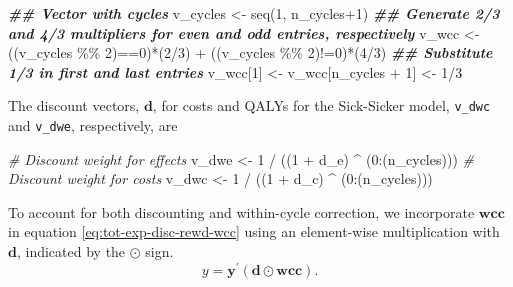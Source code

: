 \documentclass[
]{article}
\newenvironment{Shaded}{\begin{snugshade}}{\end{snugshade}}
\newcommand{\CommentTok}[1]{\textcolor[rgb]{0.56,0.35,0.01}{\textit{#1}}}
\newcommand{\DecValTok}[1]{\textcolor[rgb]{0.00,0.00,0.81}{#1}}
\newcommand{\DocumentationTok}[1]{\textcolor[rgb]{0.56,0.35,0.01}{\textbf{\textit{#1}}}}
\newcommand{\FunctionTok}[1]{\textcolor[rgb]{0.00,0.00,0.00}{#1}}
\newcommand{\NormalTok}[1]{#1}
\newcommand{\OtherTok}[1]{\textcolor[rgb]{0.56,0.35,0.01}{#1}}
\newcommand{\SpecialCharTok}[1]{\textcolor[rgb]{0.00,0.00,0.00}{#1}}
\begin{document}
\begin{Shaded}
\begin{Highlighting}[]
\DocumentationTok{\#\# Vector with cycles}
\NormalTok{v\_cycles }\OtherTok{\textless{}{-}} \FunctionTok{seq}\NormalTok{(}\DecValTok{1}\NormalTok{, n\_cycles}\SpecialCharTok{+}\DecValTok{1}\NormalTok{)}
\DocumentationTok{\#\# Generate 2/3 and 4/3 multipliers for even and odd entries, respectively}
\NormalTok{v\_wcc }\OtherTok{\textless{}{-}}\NormalTok{ ((v\_cycles }\SpecialCharTok{\%\%} \DecValTok{2}\NormalTok{)}\SpecialCharTok{==}\DecValTok{0}\NormalTok{)}\SpecialCharTok{*}\NormalTok{(}\DecValTok{2}\SpecialCharTok{/}\DecValTok{3}\NormalTok{) }\SpecialCharTok{+}\NormalTok{ ((v\_cycles }\SpecialCharTok{\%\%} \DecValTok{2}\NormalTok{)}\SpecialCharTok{!=}\DecValTok{0}\NormalTok{)}\SpecialCharTok{*}\NormalTok{(}\DecValTok{4}\SpecialCharTok{/}\DecValTok{3}\NormalTok{)}
\DocumentationTok{\#\# Substitute 1/3 in first and last entries}
\NormalTok{v\_wcc[}\DecValTok{1}\NormalTok{] }\OtherTok{\textless{}{-}}\NormalTok{ v\_wcc[n\_cycles }\SpecialCharTok{+} \DecValTok{1}\NormalTok{] }\OtherTok{\textless{}{-}} \DecValTok{1}\SpecialCharTok{/}\DecValTok{3}
\end{Highlighting}
\end{Shaded}

The discount vectors, \(\mathbf{d}\), for costs and QALYs for the Sick-Sicker model, \texttt{v\_dwc} and \texttt{v\_dwe}, respectively, are

\begin{Shaded}
\begin{Highlighting}[]
\CommentTok{\# Discount weight for effects}
\NormalTok{v\_dwe }\OtherTok{\textless{}{-}} \DecValTok{1} \SpecialCharTok{/}\NormalTok{ ((}\DecValTok{1} \SpecialCharTok{+}\NormalTok{ d\_e) }\SpecialCharTok{\^{}}\NormalTok{ (}\DecValTok{0}\SpecialCharTok{:}\NormalTok{(n\_cycles)))  }
\CommentTok{\# Discount weight for costs }
\NormalTok{v\_dwc }\OtherTok{\textless{}{-}} \DecValTok{1} \SpecialCharTok{/}\NormalTok{ ((}\DecValTok{1} \SpecialCharTok{+}\NormalTok{ d\_c) }\SpecialCharTok{\^{}}\NormalTok{ (}\DecValTok{0}\SpecialCharTok{:}\NormalTok{(n\_cycles)))    }
\end{Highlighting}
\end{Shaded}

To account for both discounting and within-cycle correction, we incorporate \(\mathbf{wcc}\) in equation \eqref{eq:tot-exp-disc-rewd-wcc} using an element-wise multiplication with \(\mathbf{d}\), indicated by the \(\odot\) sign.
\begin{equation}
 y = \mathbf{y}^{'} \left(\mathbf{d} \odot \mathbf{wcc}\right).
 \label{eq:tot-exp-disc-rewd-wcc}
\end{equation}
\end{document}
